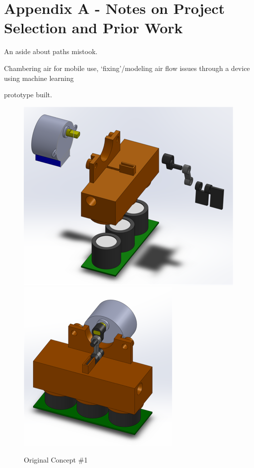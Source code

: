 \chapter{Appendix A - Notes on Project Selection and Prior Work}

An aside about paths mistook.

Chambering air for mobile use, `fixing'/modeling air flow issues through a device using machine learning

prototype built.

\begin{figure}[htb]
 	\includegraphics[width=\textwidth/2]{visuals/prevwork1a}    
 	\includegraphics[width=\textwidth/2]{visuals/prevwork1b}            
 	 \caption{Original Concept \#1}
  	\label{fig:prevwork1a}
\end{figure}

